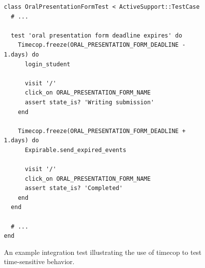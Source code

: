 \documentclass[document.tex]{subfiles}
\begin{document}
\begin{figure}[!ht]
  \begin{lstlisting}
class OralPresentationFormTest < ActiveSupport::TestCase
  # ...

  test 'oral presentation form deadline expires' do
    Timecop.freeze(ORAL_PRESENTATION_FORM_DEADLINE - 1.days) do
      login_student

      visit '/'
      click_on ORAL_PRESENTATION_FORM_NAME
      assert state_is? 'Writing submission'
    end

    Timecop.freeze(ORAL_PRESENTATION_FORM_DEADLINE + 1.days) do
      Expirable.send_expired_events

      visit '/'
      click_on ORAL_PRESENTATION_FORM_NAME
      assert state_is? 'Completed'
    end
  end

  # ...
end
  \end{lstlisting}
  \cprotect \caption{An example integration test illustrating the use of timecop to test time-sensitive behavior.}
  \label{fig:4ys-test-timecop}
\end{figure}
\end{document}

